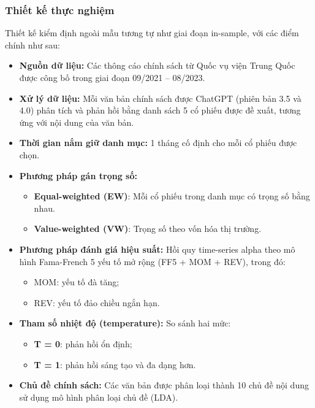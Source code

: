 \documentclass[a4paper,12pt]{article}
\begin{document}
\subsubsection{Thiết kế thực nghiệm}

Thiết kế kiểm định ngoài mẫu tương tự như giai đoạn in-sample, với các điểm chính như sau:

\begin{itemize}
    \item \textbf{Nguồn dữ liệu:} Các thông cáo chính sách từ Quốc vụ viện Trung Quốc được công bố trong giai đoạn 09/2021 – 08/2023.
    
    \item \textbf{Xử lý dữ liệu:} Mỗi văn bản chính sách được ChatGPT (phiên bản 3.5 và 4.0) phân tích và phản hồi bằng danh sách 5 cổ phiếu được đề xuất, tương ứng với nội dung của văn bản.
    
    \item \textbf{Thời gian nắm giữ danh mục:} 1 tháng cố định cho mỗi cổ phiếu được chọn.
    
    \item \textbf{Phương pháp gán trọng số:}
    \begin{itemize}
        \item \textbf{Equal-weighted (EW)}: Mỗi cổ phiếu trong danh mục có trọng số bằng nhau.
        \item \textbf{Value-weighted (VW)}: Trọng số theo vốn hóa thị trường.
    \end{itemize}
    
    \item \textbf{Phương pháp đánh giá hiệu suất:}  
    Hồi quy time-series alpha theo mô hình Fama-French 5 yếu tố mở rộng (FF5 + MOM + REV), trong đó:
    \begin{itemize}
        \item MOM: yếu tố đà tăng;
        \item REV: yếu tố đảo chiều ngắn hạn.
    \end{itemize}
    
    \item \textbf{Tham số nhiệt độ (temperature):}  
    So sánh hai mức:
    \begin{itemize}
        \item \textbf{T = 0}: phản hồi ổn định;
        \item \textbf{T = 1}: phản hồi sáng tạo và đa dạng hơn.
    \end{itemize}
    
    \item \textbf{Chủ đề chính sách:} Các văn bản được phân loại thành 10 chủ đề nội dung sử dụng mô hình phân loại chủ đề (LDA).
\end{itemize}
\end{document}

